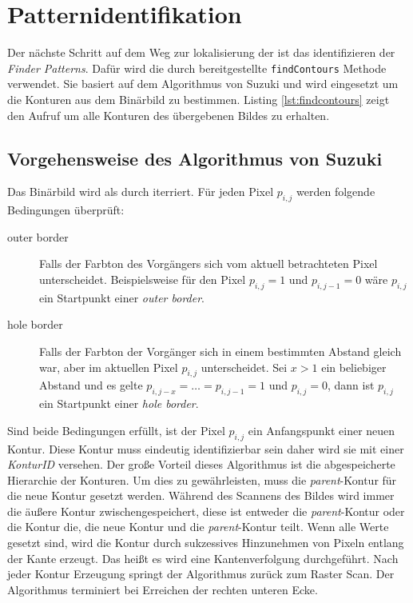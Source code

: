 \chapter{Patternidentifikation}
Der nächste Schritt auf dem Weg zur lokalisierung der \QRCodes ist das identifizieren der \emph{Finder Patterns}. Dafür wird die durch \OpenCV bereitgestellte \texttt{findContours} Methode verwendet. Sie basiert auf dem Algorithmus von Suzuki und wird eingesetzt um die Konturen aus dem Binärbild zu bestimmen.
Listing \ref{lst:findcontours} zeigt den Aufruf um alle Konturen des übergebenen Bildes zu erhalten.

\section{Vorgehensweise des Algorithmus von Suzuki}
Das Binärbild wird als durch iterriert. Für jeden Pixel $p_{i,j}$ werden folgende Bedingungen überprüft:
\begin{description}
	\item[outer border] Falls der Farbton des Vorgängers sich vom aktuell betrachteten Pixel unterscheidet. Beispielsweise für den Pixel $p_{i,j} = 1$ und $p_{i,j-1} = 0$ wäre $p_{i,j}$ ein Startpunkt einer \emph{outer border}. 
	\item[hole border] Falls der Farbton der Vorgänger sich in einem bestimmten Abstand gleich war, aber im aktuellen Pixel $p_{i,j}$ unterscheidet. Sei $x > 1$ ein beliebiger Abstand und es gelte $p_{i,j-x} =\ldots = p_{i,j-1}= 1$ und $p_{i,j} = 0$, dann ist $p_{i,j}$ ein Startpunkt einer \emph{hole border}.
\end{description}
Sind beide Bedingungen erfüllt, ist der Pixel $p_{i,j}$ ein Anfangspunkt einer neuen Kontur. Diese Kontur muss eindeutig identifizierbar sein daher wird sie mit einer \emph{KonturID} versehen. Der große Vorteil dieses Algorithmus ist die abgespeicherte Hierarchie der Konturen. Um dies zu gewährleisten, muss die \emph{parent}-Kontur für die neue Kontur gesetzt werden. Während des Scannens des Bildes wird immer die äußere Kontur zwischengespeichert, diese ist entweder die \emph{parent}-Kontur oder die Kontur die, die neue Kontur und die \emph{parent}-Kontur teilt. Wenn alle Werte gesetzt sind, wird die Kontur durch sukzessives Hinzunehmen von Pixeln entlang der Kante erzeugt. Das heißt es wird eine Kantenverfolgung durchgeführt. Nach jeder Kontur Erzeugung springt der Algorithmus zurück zum Raster Scan. Der Algorithmus terminiert bei Erreichen der rechten unteren Ecke.

